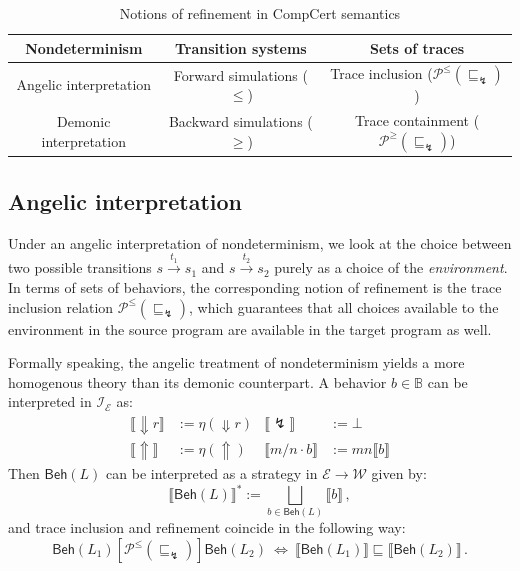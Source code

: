 \documentclass[11pt,oneside,draft]{book}
\theoremstyle{definition}
\newcommand{\kw}[1]{\ensuremath{ \mathsf{#1} }}
\newcommand{\ifr}[1]{\mathrel{[{#1}]}}
\newcommand{\refby}{\sqsubseteq} %
\begin{document}
\begin{table} %
  \centering
  \begin{tabular}{ccc}
    \hline
    Nondeterminism
      & Transition systems
      & Sets of traces \\
    \hline
    Angelic interpretation
      & Forward simulations ($\le$)
      & Trace inclusion ($\mathcal{P}^\le(\refby_\lightning)$) \\
    Demonic interpretation
      & Backward simulations ($\ge$)
      & Trace containment ($\mathcal{P}^\ge(\refby_\lightning)$) \\
    \hline
  \end{tabular}
  \caption{Notions of refinement in CompCert semantics}
  \label{tbl:compcertref}
\end{table}


\subsection{Angelic interpretation} %

Under an angelic interpretation of nondeterminism,
we look at the choice between two possible transitions
$
  s \stackrel{t_1}{\longrightarrow} s_1
$
and
$
  s \stackrel{t_2}{\longrightarrow} s_2
$
purely as a choice of the \emph{environment}.
In terms of sets of behaviors,
the corresponding notion of refinement
is the trace inclusion relation
$\mathcal{P}^\le({\refby_\lightning})$,
which guarantees that
all choices available to the environment in the source program
are available in the target program as well.

Formally speaking,
the angelic treatment of nondeterminism
yields a more homogenous theory
than its demonic counterpart.
A behavior $b \in \mathbb{B}$ can be interpreted
in $\mathcal{I}_\mathcal{E}$ as:
\begin{align*}
  \llbracket {\Downarrow}r \rrbracket &:= \eta({\Downarrow} r) &
  \llbracket {\lightning} \rrbracket &:= \bot \\
  \llbracket {\Uparrow} \rrbracket &:= \eta({\Uparrow}) &
  \llbracket m / n \cdot b \rrbracket &:=
    m n \llbracket b \rrbracket
\end{align*}
Then $\kw{Beh}(L)$ can be interpreted as a strategy
in $\mathcal{E} \rightarrow \mathcal{W}$ given by:
\[
  \llbracket \kw{Beh}(L) \rrbracket^* :=
    \bigsqcup_{b \in \kw{Beh}(L)} \llbracket b \rrbracket
  \,,
\]
and trace inclusion and refinement
coincide in the following way:
\[
  \kw{Beh}(L_1)
  \ifr{\mathcal{P}^\le({\refby_\lightning})}
  \kw{Beh}(L_2)
  \: \Leftrightarrow \:
  \llbracket \kw{Beh}(L_1) \rrbracket
  \refby
  \llbracket \kw{Beh}(L_2) \rrbracket
  \,.
\]
\end{document}

